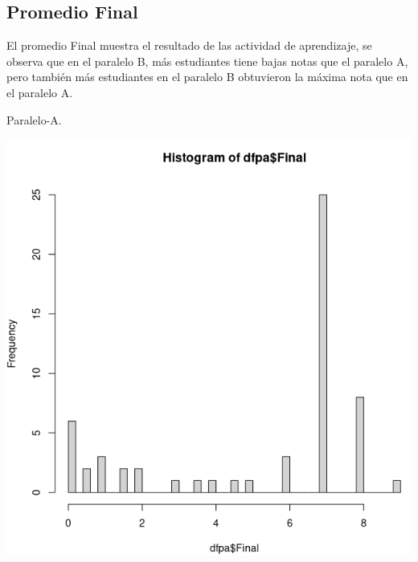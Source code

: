 \documentclass[a4pa<per,12pt,spanish]{article}
\begin{document}
\subsection{Promedio  Final}
\label{sec:actividad-E2}
El promedio Final muestra el resultado de las actividad de aprendizaje, se observa que en el paralelo B, más estudiantes tiene bajas notas que el paralelo A, pero también más estudiantes en el paralelo B obtuvieron la máxima nota que en el paralelo A.\\




\begin{minipage}[h]{0.45\linewidth}
Paralelo-A.

\includegraphics[scale=0.3]{images/histoFinal.png}
\end{minipage}
\end{document}
